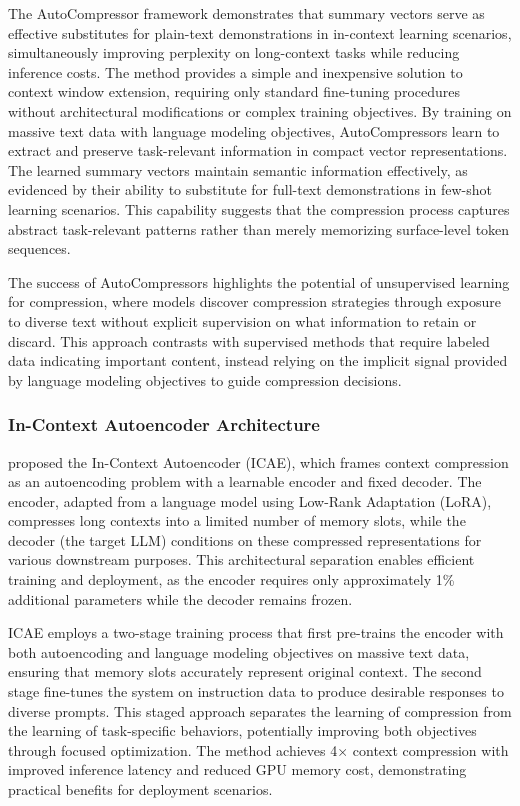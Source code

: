 The AutoCompressor framework demonstrates that summary vectors serve as effective substitutes for plain-text demonstrations in in-context learning scenarios, simultaneously improving perplexity on long-context tasks while reducing inference costs. The method provides a simple and inexpensive solution to context window extension, requiring only standard fine-tuning procedures without architectural modifications or complex training objectives. By training on massive text data with language modeling objectives, AutoCompressors learn to extract and preserve task-relevant information in compact vector representations. The learned summary vectors maintain semantic information effectively, as evidenced by their ability to substitute for full-text demonstrations in few-shot learning scenarios. This capability suggests that the compression process captures abstract task-relevant patterns rather than merely memorizing surface-level token sequences.

The success of AutoCompressors highlights the potential of unsupervised learning for compression, where models discover compression strategies through exposure to diverse text without explicit supervision on what information to retain or discard. This approach contrasts with supervised methods that require labeled data indicating important content, instead relying on the implicit signal provided by language modeling objectives to guide compression decisions.

\subsubsection{In-Context Autoencoder Architecture}

\citet{ge2024icae} proposed the In-Context Autoencoder (ICAE), which frames context compression as an autoencoding problem with a learnable encoder and fixed decoder. The encoder, adapted from a language model using Low-Rank Adaptation (LoRA), compresses long contexts into a limited number of memory slots, while the decoder (the target LLM) conditions on these compressed representations for various downstream purposes. This architectural separation enables efficient training and deployment, as the encoder requires only approximately 1\% additional parameters while the decoder remains frozen.

ICAE employs a two-stage training process that first pre-trains the encoder with both autoencoding and language modeling objectives on massive text data, ensuring that memory slots accurately represent original context. The second stage fine-tunes the system on instruction data to produce desirable responses to diverse prompts. This staged approach separates the learning of compression from the learning of task-specific behaviors, potentially improving both objectives through focused optimization. The method achieves 4$\times$ context compression with improved inference latency and reduced GPU memory cost, demonstrating practical benefits for deployment scenarios.

